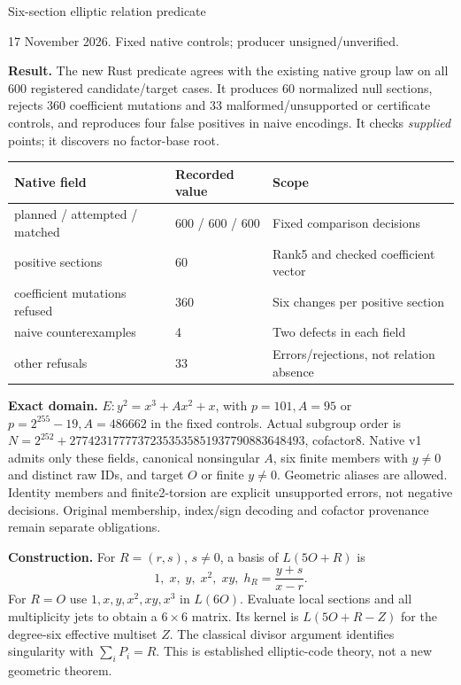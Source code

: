 \documentclass[10pt]{article}
\begin{document}
{\LARGE Six-section elliptic relation predicate}\par
17 November 2026. Fixed native controls; producer unsigned/unverified.

\textbf{Result.} The new Rust predicate agrees with the existing native group
law on all 600 registered candidate/target cases. It produces 60 normalized
null sections, rejects 360 coefficient mutations and 33 malformed/unsupported
or certificate controls, and reproduces four false positives in naive
encodings. It checks \emph{supplied} points; it discovers no factor-base root.

\begin{center}\begin{tabular}{@{}lll@{}}
\toprule
Native field & Recorded value & Scope\\\midrule
planned / attempted / matched &600 / 600 / 600& Fixed comparison decisions\\
positive sections &60& Rank5 and checked coefficient vector\\
coefficient mutations refused &360& Six changes per positive section\\
naive counterexamples &4& Two defects in each field\\
other refusals &33& Errors/rejections, not relation absence\\\bottomrule
\end{tabular}\end{center}

\textbf{Exact domain.} $E:y^2=x^3+Ax^2+x$, with $p=101,A=95$ or
$p=2^{255}-19,A=486662$ in the fixed controls. Actual subgroup order is
$N=2^{252}+27742317777372353535851937790883648493$, cofactor8.
Native v1 admits only these fields, canonical nonsingular $A$, six finite
members with $y\ne0$ and distinct raw IDs, and target $O$ or finite $y\ne0$.
Geometric aliases are allowed. Identity members and finite2-torsion are
explicit unsupported errors, not negative decisions. Original membership,
index/sign decoding and cofactor provenance remain separate obligations.

\textbf{Construction.} For $R=(r,s)$, $s\ne0$, a basis of $L(5O+R)$ is
\[
 1,\;x,\;y,\;x^2,\;xy,\;h_R=\frac{y+s}{x-r}.
\]
For $R=O$ use $1,x,y,x^2,xy,x^3$ in $L(6O)$. Evaluate local sections and
all multiplicity jets to obtain a $6\times6$ matrix. Its kernel is
$L(5O+R-Z)$ for the degree-six effective multiset $Z$. The classical divisor
argument identifies singularity with $\sum_i P_i=R$. This is established
elliptic-code theory, not a new geometric theorem.
\end{document}
